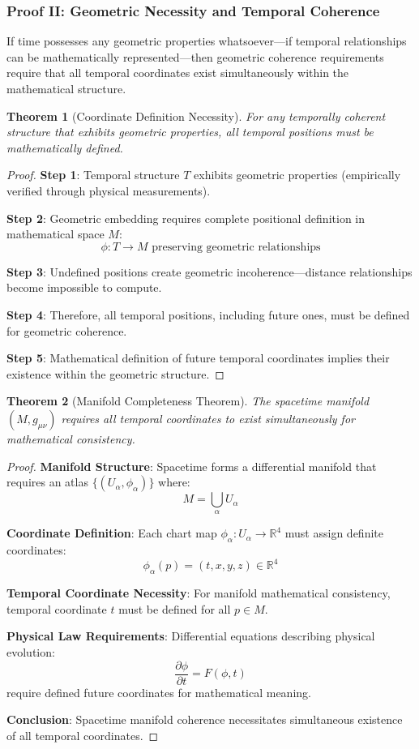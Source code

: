 \documentclass[12pt,a4paper]{article}
\newtheorem{theorem}{Theorem}[section]
\begin{document}
\subsubsection{Proof II: Geometric Necessity and Temporal Coherence}

If time possesses any geometric properties whatsoever—if temporal relationships can be mathematically represented—then geometric coherence requirements require that all temporal coordinates exist simultaneously within the mathematical structure.

\begin{theorem}[Coordinate Definition Necessity]
For any temporally coherent structure that exhibits geometric properties, all temporal positions must be mathematically defined.
\end{theorem}

\begin{proof}
\textbf{Step 1}: Temporal structure $T$ exhibits geometric properties (empirically verified through physical measurements).

\textbf{Step 2}: Geometric embedding requires complete positional definition in mathematical space $M$:
$$\phi: T \to M \text{ preserving geometric relationships}$$

\textbf{Step 3}: Undefined positions create geometric incoherence—distance relationships become impossible to compute.

\textbf{Step 4}: Therefore, all temporal positions, including future ones, must be defined for geometric coherence.

\textbf{Step 5}: Mathematical definition of future temporal coordinates implies their existence within the geometric structure.
\end{proof}

\begin{theorem}[Manifold Completeness Theorem]
The spacetime manifold $(M, g_{\mu\nu})$ requires all temporal coordinates to exist simultaneously for mathematical consistency.
\end{theorem}

\begin{proof}
\textbf{Manifold Structure}: Spacetime forms a differential manifold that requires an atlas $\{(U_\alpha, \phi_\alpha)\}$ where:
$$M = \bigcup_\alpha U_\alpha$$

\textbf{Coordinate Definition}: Each chart map $\phi_\alpha: U_\alpha \to \mathbb{R}^4$ must assign definite coordinates:
$$\phi_\alpha(p) = (t, x, y, z) \in \mathbb{R}^4$$

\textbf{Temporal Coordinate Necessity}: For manifold mathematical consistency, temporal coordinate $t$ must be defined for all $p \in M$.

\textbf{Physical Law Requirements}: Differential equations describing physical evolution:
$$\frac{\partial\phi}{\partial t} = F(\phi, t)$$
require defined future coordinates for mathematical meaning.

\textbf{Conclusion}: Spacetime manifold coherence necessitates simultaneous existence of all temporal coordinates.
\end{proof}
\end{document}

